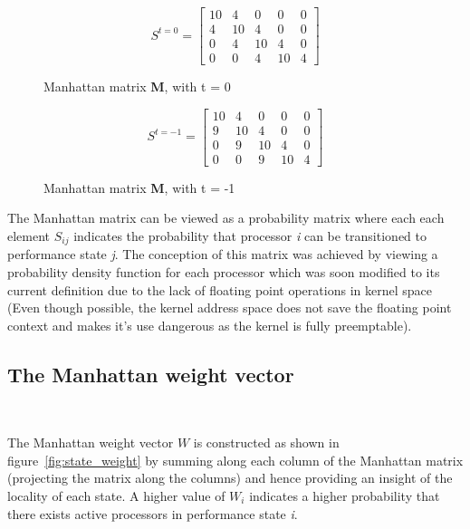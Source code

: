 \begin{figure}[h!]
\centering
\begin{equation*}
    S^{t = 0} = \left[
     \begin{array}{ccccc}
       10 & 4 & 0 & 0 & 0 \\
       4 & 10 & 4 & 0 & 0 \\
       0 & 4 & 10 & 4 & 0 \\
       0 & 0 & 4 & 10 & 4
     \end{array}
   \right]
\end{equation*}
\caption{Manhattan matrix \textbf{M}, with t = 0}
\label{fig:ex_dmut0}
\end{figure}

\begin{figure}[h!]
\centering
\begin{equation*}
    S^{t = -1} = \left[
     \begin{array}{ccccc}
       10 & 4 & 0 & 0 & 0 \\
       9 & 10 & 4 & 0 & 0 \\
       0 & 9 & 10 & 4 & 0 \\
       0 & 0 & 9 & 10 & 4
     \end{array}
   \right]
\end{equation*}
\caption{Manhattan matrix \textbf{M}, with t = -1}
\label{fig:ex_dmutl}
\end{figure}

The Manhattan matrix can be viewed as a probability matrix where each each element
$S_{ij}$ indicates the probability that processor \textit{i} can be transitioned to
performance state \textit{j}. The conception of this matrix was achieved by viewing
a probability density function for each processor which was soon modified to its
current definition due to the lack of floating point operations in kernel space 
(Even though possible, the kernel address space does not save the floating point 
context and makes it's use dangerous as the kernel is fully preemptable).

\subsection{The Manhattan weight vector}~\label{sec:weight}

The Manhattan weight vector $W$ is constructed as shown in figure~\ref{fig:state_weight} by summing along each column 
of the Manhattan matrix (projecting the matrix along the columns) and hence
providing an insight of the locality of each state. A higher value of $W_i$ 
indicates a higher probability that there exists active processors in 
performance state \textit{i}. 

